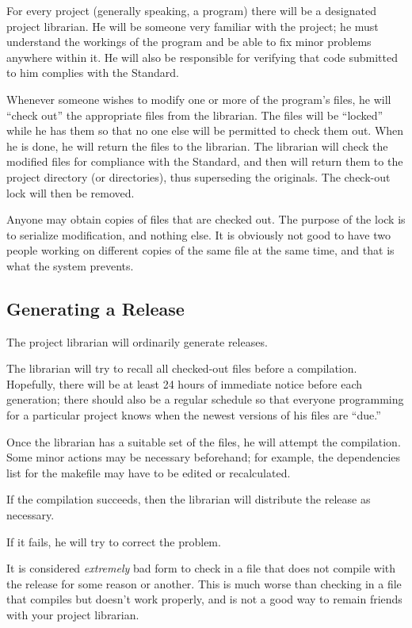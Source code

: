 For every project (generally speaking, a program) there will be a
designated project librarian.  He will be someone very familiar with
the project; he must understand the workings of the program and be
able to fix minor problems anywhere within it.  He will also be
responsible for verifying that code submitted to him complies with the
Standard.

Whenever someone wishes to modify one or more of the program's files,
he will ``check out'' the appropriate files from the librarian.  The
files will be ``locked'' while he has them so that no one else will be
permitted to check them out.  When he is done, he will return the
files to the librarian.  The librarian will check the modified files
for compliance with the Standard, and then will return them to the
project directory (or directories), thus superseding the originals.
The check-out lock will then be removed.

Anyone may obtain copies of files that are checked out.  The purpose
of the lock is to serialize modification, and nothing else.  It is
obviously not good to have two people working on different copies of
the same file at the same time, and that is what the system prevents.

\subsection{Generating a Release}
The project librarian will ordinarily generate releases.

The librarian will try to recall all checked-out files before a
compilation.  Hopefully, there will be at least 24 hours of immediate
notice before each generation; there should also be a regular schedule
so that everyone programming for a particular project knows when the
newest versions of his files are ``due.''

Once the librarian has a suitable set of the files, he will attempt
the compilation.  Some minor actions may be necessary beforehand; for
example, the dependencies list for the makefile may have to be edited
or recalculated.

If the compilation succeeds, then the librarian will distribute the
release as necessary.

If it fails, he will try to correct the problem.

It is considered {\em extremely} bad form to check in a file that does
not compile with the release for some reason or another.  This is much
worse than checking in a file that compiles but doesn't work properly,
and is not a good way to remain friends with your project librarian.

